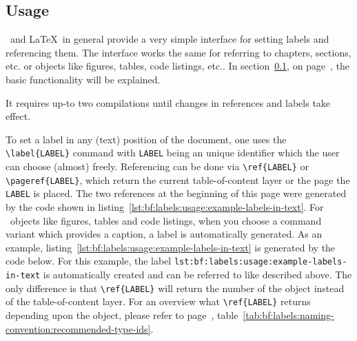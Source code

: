 	\subsection{Usage}
		\label{subsec:bf:labels:usage}
		\lstset{style=LaTeX}
		\productName~and \LaTeX~in general provide a very simple interface for setting labels and referencing them. The interface works the same for referring to chapters, sections, etc. or objects like figures, tables, code listings, etc.. In \mbox{section \ref{subsec:bf:labels:usage}}, on 
		\mbox{page \pageref{subsec:bf:labels:usage}}, the basic functionality will be explained.
		\begin{daInfoBox}
			It requires up-to two compilations until changes in references and labels take effect.
		\end{daInfoBox}
		To set a label in any (text) position of the document, one uses the \lstinline$\label{LABEL}$ command with \lstinline{LABEL} being an unique identifier which the user can choose (almost) freely.
		\newline Referencing can be done via \lstinline$\ref{LABEL}$ or \lstinline$\pageref{LABEL}$, which return the current table-of-content layer or the page the \lstinline$LABEL$ is placed. The two references at the beginning of this page were generated by the code shown in \mbox{listing \ref{lst:bf:labels:usage:example-labels-in-text}}.
		For \productName~objects like figures, tables and code listings, when you choose a command variant which provides a caption, a label is automatically generated. As an example, \mbox{listing \ref{lst:bf:labels:usage:example-labels-in-text}} is generated by the code below.
		For this example, the label \lstinline$lst:bf:labels:usage:example-labels-in-text$ is automatically created and can be referred to like described above. The only difference is that \lstinline$\ref{LABEL}$ will return the number of the object instead of the table-of-content layer. For an overview what \lstinline$\ref{LABEL}$ returns depending upon the object, please refer to \mbox{page \pageref{tab:bf:labels:naming-convention:recommended-type-ids}},  \mbox{table \ref{tab:bf:labels:naming-convention:recommended-type-ids}}.
		
